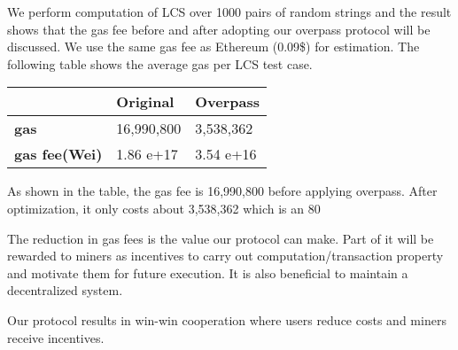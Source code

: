 We perform computation of LCS over 1000 pairs of random strings and the result shows that the gas fee before and after adopting our overpass protocol will be discussed. We use the same gas fee as Ethereum (0.09\$) for estimation. The following table shows the average gas per LCS test case. 
\begin{table}[H]
\begin{tabular}{|l|l|l|}
\hline
                      & Original   & Overpass  \\ \hline
\textbf{gas}          & 16,990,800 & 3,538,362 \\ \hline
\textbf{gas fee(Wei)} & 1.86 e+17  & 3.54 e+16 \\ \hline
\end{tabular}
\end{table}
As shown in the table, the gas fee is 16,990,800 before applying overpass. After optimization, it only costs about 3,538,362 which is an 80%

The reduction in gas fees is the value our protocol can make. Part of it will be rewarded to miners as incentives to carry out computation/transaction property and motivate them for future execution. It is also beneficial to maintain a decentralized system. 

Our protocol results in win-win cooperation where users reduce costs and miners receive incentives. 
